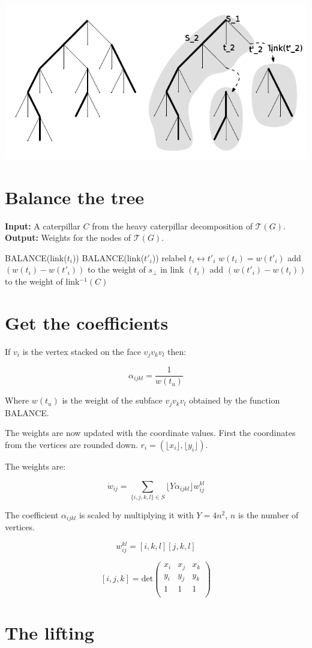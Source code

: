 \documentclass[10pt,a4paper]{article}
\newcommand{\Tau}{\mathcal{T}}
\begin{document}
\includegraphics[scale=1]{caterpillarEdit.png} 

\section{Balance the tree}
\begin{algorithmic}
\State \textbf{Input:} A caterpillar $C$ from the heavy caterpillar decomposition of $\Tau(G)$.
\State \textbf{Output:} Weights for the nodes of $\Tau(G)$.

	\State BALANCE(link($t_i$))
	\State BALANCE(link($t'_i$))
        \State relabel $t_i \leftrightarrow t'_i$
    \EndIf
	\State $w(t_i)=w(t'_i)$
	\State add $(w(t_i ) - w(t'_i ))$ to the weight of $s_{\bot}$ in link $(t_i)$
	\State add $(w(t'_i ) - w(t_i ))$ to the weight of link$^{-1} (C)$
\EndFor
\EndFunction
\end{algorithmic}


\section{Get the coefficients}

If $v_i$ is the vertex stacked on the face $v_jv_kv_l$ then:

$$\alpha_{ijkl} = \frac{1}{w(t_u)}$$

Where $w(t_u)$ is the weight of the subface $v_jv_kv_l$ obtained by the function BALANCE.

The weights are now updated with the coordinate values. First the coordinates from the vertices are rounded down. $r_i = (\lfloor x_i \rfloor, \lfloor y_i\rfloor)$.

The weights are:

$$\dot{w}_{ij}= \sum_{\{i,j,k,l\}\in S} \lfloor Y \alpha_{ijkl}\rfloor w^{kl}_{ij}$$   

The coefficient $\alpha_{ijkl}$ is scaled by multiplying it with $Y = 4 n^2$, $n$ is the number of vertices.


$$w^{kl}_{ij}= [i,k,l][j,k,l]$$

$$
[i,j,k]= \text{det}
 \begin{pmatrix}
  x_i & x_j & x_k\\
  y_i & y_j & y_k\\
  1	  & 1   & 1  \\
 \end{pmatrix}
$$

\section{The lifting}
\end{document}
